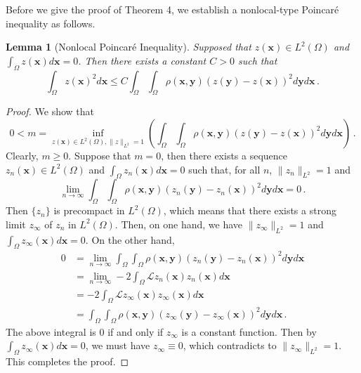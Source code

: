 \documentclass{article}
\newtheorem{lemma}[theorem]{Lemma}
\newcommand{\xb}{\bm{x}}
\newcommand{\yb}{\bm{y}}
\begin{document}
Before we give the proof of Theorem 4, we establish a nonlocal-type Poincar\'e inequality as follows.
\begin{lemma}[Nonlocal Poincar\'e Inequality]
Supposed that $z(\xb)\in L^2(\Omega)$ and $\int_\Omega z(\xb)d\xb = 0$. Then there exists a constant $C>0$ such that
\[
\int_\Omega z(\xb)^2 d\xb \le C \int_\Omega\int_\Omega \rho(\xb,\yb)(z(\yb)-z(\xb))^2d\yb d\xb\,.
\]
\end{lemma}
\begin{proof}
We show that
\[
0 < m = \inf_{z(\xb)\in L^2(\Omega), \|z\|_{L^2}=1}\left( \int_\Omega\int_\Omega \rho(\xb,\yb)(z(\yb)-z(\xb))^2d\yb d\xb\right)\,.
\]
Clearly, $m\ge 0$. Suppose that $m=0$, then there exists a sequence $z_n(\xb)\in L^2(\Omega)$ and $\int_\Omega z_n(\xb)d\xb=0$ such that, for all $n$, $\|z_n\|_{L^2}=1$ and
\[
\lim_{n\to\infty}  \int_\Omega\int_\Omega \rho(\xb,\yb)(z_n(\yb)-z_n(\xb))^2d\yb d\xb=0\,.
\]
Then $\{z_n\}$ is precompact in $L^2(\Omega)$, which means that there exists a strong limit $z_\infty$ of $z_n$ in $L^2(\Omega)$. Then, on one hand, we have $\|z_\infty\|_{L^2}=1$ and $\int_\Omega z_\infty(\xb)d\xb=0$. On the other hand,
\[
\begin{aligned}
0 &= \lim_{n\to \infty} \int_\Omega\int_\Omega \rho(\xb,\yb)(z_n(\yb)-z_n(\xb))^2d\yb d\xb \\
&=\lim_{n\to \infty} -2\int_\Omega \mathcal{L} z_n(\xb) z_n(\xb) d\xb\\
&=-2\int_\Omega \mathcal{L} z_\infty(\xb) z_\infty(\xb) d\xb\\
&=  \int_\Omega\int_\Omega \rho(\xb,\yb)(z_\infty(\yb)-z_\infty(\xb))^2d\yb d\xb\,.
\end{aligned}
\]
The above integral is 0 if and only if $z_\infty$ is a constant function. Then by $\int_\Omega z_\infty(\xb)d\xb = 0$, we must have $z_\infty\equiv 0$, which contradicts to $\|z_\infty\|_{L^2}=1$. This completes the proof.
\end{proof}
\end{document}
